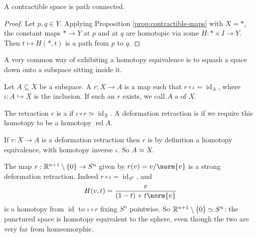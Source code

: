\documentclass[a4paper]{scrartcl}
\newcommand{\id}{\operatorname{id}}
\newcommand{\rel}{\operatorname{rel}}
\begin{document}
\begin{corollary}
	A contractible space is path connected.
\end{corollary}
\begin{proof}
	Let $p, q \in Y$. Applying Proposition \ref{prop:contractible-maps} with $X = *$, the constant maps $* \to Y$ at $p$ and at $q$ are homotopic via some $H: * \times I \to Y$. Then $t \mapsto H(*, t)$ is a path from $p$ to $q$.
\end{proof}

A very common way of exhibiting a homotopy equivalence is to squash a space down onto a
subspace sitting inside it.

\begin{definition}[Retraction]
	Let $A \subseteq X$ be a subspace. A  $r:X \rightarrow A$ is a map such that $r \circ \iota = \id_A$, where $\iota: A \hookrightarrow X$ is the inclusion. If such an $r$ exists, we call $A$ a  of $X$.

	The retraction $r$ is a  if $\iota \circ r \simeq \id_X$. A deformation retraction is  if we require this homotopy to be a homotopy $\rel A$.
\end{definition}

If $r: X \to A$ is a deformation retraction then $r$ is by definition a homotopy
equivalence, with homotopy inverse $\iota$. So $A \simeq X$.

\begin{example} \label{ex:sdr-sphere}
	The map $r: \mathbb{R}^{n+1} \setminus \{0\} \to S^n$ given by $r(v) = v/\norm{v}$ is a strong deformation retraction. Indeed $r \circ \iota = \id_{S^n}$, and
	$$
	H(v, t) = \frac{v}{(1-t) + t\norm{v}}
	$$
	is a homotopy from $\id$ to $\iota \circ r$ fixing $S^n$ pointwise. So $\mathbb{R}^{n+1} \setminus \{0\} \simeq S^n$: the punctured space is homotopy equivalent to the sphere, even though the two are very far from homeomorphic.
\end{example}

\begin{center}
\end{center}
\end{document}
